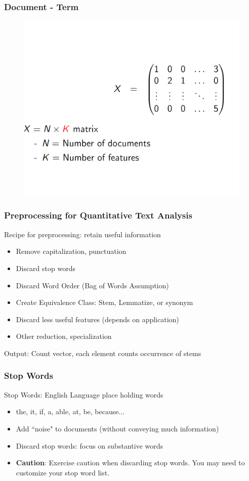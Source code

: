 \documentclass[compress, aspectratio=54]{beamer}
\begin{document}

\begin{frame}
\frametitle{Document - Term}
\begin{figure}

\includegraphics[width=0.5\linewidth ]{Figures/document_term.png}
\end{figure}

\end{frame}



\begin{frame}
\frametitle{Preprocessing for Quantitative Text Analysis}
Recipe for preprocessing: retain useful information
\begin{itemize}
\item Remove capitalization, punctuation
\item Discard stop words
\item Discard Word Order (Bag of Words Assumption)
\item Create Equivalence Class: Stem, Lemmatize, or synonym
\item Discard less useful features (depends on application)
\item Other reduction, specialization


\end{itemize}
Output: Count vector, each element counts occurrence of stems
\end{frame}


\begin{frame}
\frametitle{Stop Words}
Stop Words: English Language place holding words
\begin{itemize}
\item the, it, if, a, able, at, be, because...
\item Add ``noise" to documents (without conveying much information)
\item Discard stop words: focus on substantive words
\item \textbf{Caution}: Exercise caution when discarding stop words. You may need to customize your stop word list.
\end{itemize}
\end{frame}
\end{document}
